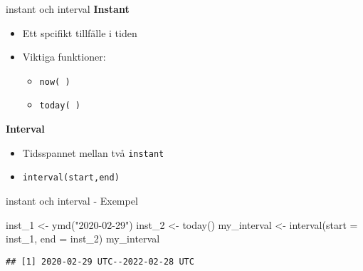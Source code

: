 \documentclass[
  11pt,
  ignorenonframetext,
  handout]{beamer}
\newenvironment{Shaded}{\begin{snugshade}}{\end{snugshade}}
\newcommand{\AttributeTok}[1]{\textcolor[rgb]{0.77,0.63,0.00}{#1}}
\newcommand{\FunctionTok}[1]{\textcolor[rgb]{0.00,0.00,0.00}{#1}}
\newcommand{\NormalTok}[1]{#1}
\newcommand{\OtherTok}[1]{\textcolor[rgb]{0.56,0.35,0.01}{#1}}
\newcommand{\StringTok}[1]{\textcolor[rgb]{0.31,0.60,0.02}{#1}}
\providecommand{\tightlist}{%
  \setlength{\itemsep}{0pt}\setlength{\parskip}{0pt}}
\begin{document}
\begin{frame}{instant och interval}
\protect\hypertarget{instant-och-interval}{}
\textbf{Instant}

\begin{itemize}
\tightlist
\item
  Ett spcifikt tillfälle i tiden
\item
  Viktiga funktioner:

  \begin{itemize}
  \tightlist
  \item
    \texttt{now( )}
  \item
    \texttt{today( )}
  \end{itemize}
\end{itemize}

\textbf{Interval}

\begin{itemize}
\tightlist
\item
  Tidsspannet mellan två \texttt{instant}
\item
  \texttt{interval(start,end)}
\end{itemize}
\end{frame}

\begin{frame}[fragile]{instant och interval - Exempel}
\protect\hypertarget{instant-och-interval---exempel}{}
\begin{Shaded}
\begin{Highlighting}[]
\NormalTok{inst\_1 }\OtherTok{\textless{}{-}} \FunctionTok{ymd}\NormalTok{(}\StringTok{"2020{-}02{-}29"}\NormalTok{)}
\NormalTok{inst\_2 }\OtherTok{\textless{}{-}} \FunctionTok{today}\NormalTok{()}
\NormalTok{my\_interval }\OtherTok{\textless{}{-}} \FunctionTok{interval}\NormalTok{(}\AttributeTok{start =}\NormalTok{ inst\_1, }\AttributeTok{end =}\NormalTok{ inst\_2)}
\NormalTok{my\_interval}
\end{Highlighting}
\end{Shaded}

\begin{verbatim}
## [1] 2020-02-29 UTC--2022-02-28 UTC
\end{verbatim}
\end{frame}
\end{document}
